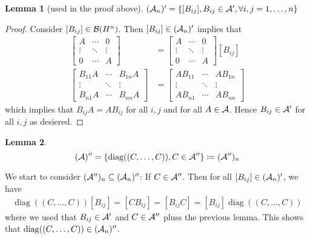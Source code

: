 \documentclass[10pt,english,a4paper]{article}
\theoremstyle{definition}
\newtheorem*{lemma}{Lemma}
\DeclareMathOperator{\diag}{diag}
\begin{document}
\begin{lemma}[used in the proof above]
    $(\mathcal{A}_n)' = \{[B_{ij}], B_{ij} \in \mathcal{A}', \forall i,j = 1,\ldots,n\}$
\end{lemma}
\begin{proof}
    Consider $[B_{ij}] \in \mathcal{B}(H^n)$. 
Then $[B_{ij}] \in (\mathcal{A}_n)'$ implies that 
\begin{align*}
    [B_{ij}]
\begin{bmatrix} A &\cdots & 0 \\ \vdots &\ddots &\vdots\\ 0 &\cdots &A \end{bmatrix}
&= 
\begin{bmatrix} A &\cdots & 0 \\ \vdots &\ddots &\vdots\\ 0 &\cdots &A \end{bmatrix}
[B_{ij}] \\
\begin{bmatrix} B_{11}A &\cdots & B_{1n}A \\ \vdots &\ddots &\vdots\\ B_{n1}A &\cdots &B_{nn}A \end{bmatrix}
&= 
\begin{bmatrix} AB_{11} &\cdots & AB_{1n} \\ \vdots &\ddots &\vdots\\ AB_{n1} &\cdots &AB_{nn} \end{bmatrix}
\end{align*}
which implies that 
$B_{ij}A = AB_{ij}$ for all $i,j$ and for all $A \in \mathcal{A}$. Hence
$B_{ij} \in \mathcal{A}'$ for all $i,j$ as desiered. 
\end{proof}

\begin{lemma}
    \[(\As)'' = \left\{\diag((C,\ldots, C)), C \in \As''\right\} \coloneqq (\As'')_n\]
\end{lemma}
We start to consider $(\mathcal{A}'')_n\subseteq (\mathcal{A}_n)''$: If $C \in \mathcal{A}''$. Then for all 
$[B_{ij}] \in (\mathcal{A}_n)'$, we have 
\begin{align*}
    \diag((C,\ldots, C))[B_{ij}] = [CB_{ij}] = [B_{ij}C] = [B_{ij}]\diag((C,\ldots,C))
\end{align*}
where we used that $B_{ij}\in \mathcal{A}'$ and $C\in \mathcal{A}''$ pluss the previous lemma.
This shows that 
$\diag((C,\ldots, C)) \in (\As_n)''$.
\end{document}

